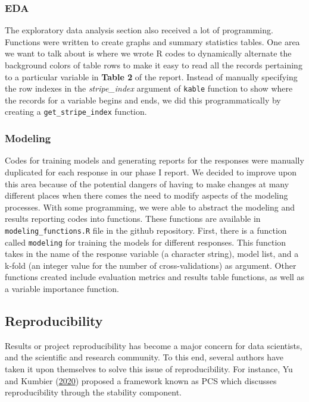 \documentclass[
  10pt,
]{article}
\begin{document}
\hypertarget{eda}{%
\subsubsection{EDA}\label{eda}}

The exploratory data analysis section also received a lot of programming. Functions were written to create graphs and summary statistics tables. One area we want to talk about is where we wrote R codes to dynamically alternate the background colors of table rows to make it easy to read all the records pertaining to a particular variable in \textbf{Table 2} of the report. Instead of manually specifying the row indexes in the \emph{stripe\_index} argument of \texttt{kable} function to show where the records for a variable begins and ends, we did this programmatically by creating a \texttt{get\_stripe\_index} function.

\hypertarget{modeling}{%
\subsubsection{Modeling}\label{modeling}}

Codes for training models and generating reports for the responses were manually duplicated for each response in our phase I report. We decided to improve upon this area because of the potential dangers of having to make changes at many different places when there comes the need to modify aspects of the modeling processes. With some programming, we were able to abstract the modeling and results reporting codes into functions. These functions are available in \texttt{modeling\_functions.R} file in the github repository. First, there is a function called \texttt{modeling} for training the models for different responses. This function takes in the name of the response variable (a character string), model list, and a k-fold (an integer value for the number of cross-validations) as argument. Other functions created include evaluation metrics and results table functions, as well as a variable importance function.

\hypertarget{reproducibility}{%
\subsection{Reproducibility}\label{reproducibility}}

Results or project reproducibility has become a major concern for data scientists, and the scientific and research community. To this end, several authors have taken it upon themselves to solve this issue of reproducibility. For instance, Yu and Kumbier (\protect\hyperlink{ref-yu2020veridical}{2020}) proposed a framework known as PCS which discusses reproducibility through the stability component.
\end{document}
